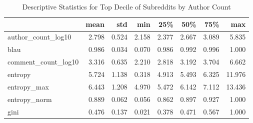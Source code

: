\begin{table}
\centering
\begin{tabular}{lrrrrrrr}
\toprule
{} &  mean &   std &   min &   25\% &   50\% &   75\% &    max \\
\midrule
author\_count\_log10  & 2.798 & 0.524 & 2.158 & 2.377 & 2.667 & 3.089 &  5.835 \\
blau                & 0.986 & 0.034 & 0.070 & 0.986 & 0.992 & 0.996 &  1.000 \\
comment\_count\_log10 & 3.316 & 0.635 & 2.210 & 2.818 & 3.192 & 3.704 &  6.662 \\
entropy             & 5.724 & 1.138 & 0.318 & 4.913 & 5.493 & 6.325 & 11.976 \\
entropy\_max         & 6.443 & 1.208 & 4.970 & 5.472 & 6.142 & 7.112 & 13.436 \\
entropy\_norm        & 0.889 & 0.062 & 0.056 & 0.862 & 0.897 & 0.927 &  1.000 \\
gini                & 0.476 & 0.137 & 0.021 & 0.378 & 0.471 & 0.567 &  1.000 \\
\bottomrule
\end{tabular}
\caption{Descriptive Statistics for Top Decile of Subreddits by Author Count}
\label{table/active}
\end{table}